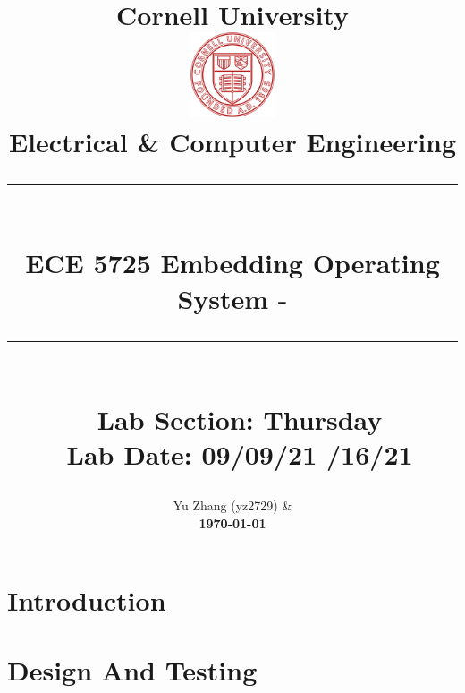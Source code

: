 \documentclass[11pt]{report}
\newcommand{\HRule}[1]{\rule{\linewidth}{#1}}
\begin{document}
\date{}

\title{ \normalsize {\textbf{Cornell University}}
		\\ [1.0cm]
		\includegraphics[width=25mm]{img/cornell_logo.png}\\[.5cm]
		Electrical & Computer Engineering\\
		\HRule{2pt} \\
		\LARGE \textbf{ ECE 5725 Embedding Operating System - {}} %
		\HRule{2pt} \\ [0.5cm]
		\normalsize \ {Lab Section: Thursday} \\
		\normalsize \ {Lab Date: 09/09/21 /16/21} \vspace*{5\baselineskip}\\
		}
		
\author{
		{Yu Zhang (yz2729)} \quad \&  \\[5cm]
		\large {\textbf{\today} } 
		}
		

\maketitle




\section*{Introduction}



\section*{Design And Testing}
\end{document}
